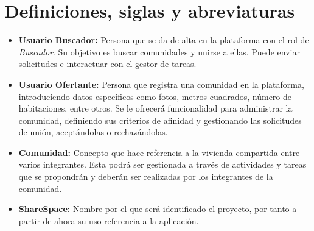 \section{Definiciones, siglas y abreviaturas}
\begin{itemize}
    \item \textbf{Usuario Buscador:} Persona que se da de alta en la plataforma con el rol de \textit{Buscador}. Su objetivo es buscar comunidades y unirse a ellas. Puede enviar solicitudes e interactuar con el gestor de tareas.
    \item \textbf{Usuario Ofertante:} Persona que registra una comunidad en la plataforma, introduciendo datos específicos como fotos, metros cuadrados, número de habitaciones, entre otros. Se le ofrecerá funcionalidad para administrar la comunidad, definiendo sus criterios de afinidad y gestionando las solicitudes de unión, aceptándolas o rechazándolas.
    \item \textbf{Comunidad:} Concepto que hace referencia a la vivienda compartida entre varios integrantes. Esta podrá ser gestionada a través de actividades y tareas que se propondrán y deberán ser realizadas por los integrantes de la comunidad.
    \item \textbf{ShareSpace:} Nombre por el que será identificado el proyecto, por tanto a partir de ahora su uso referencia a la aplicación.
\end{itemize}



